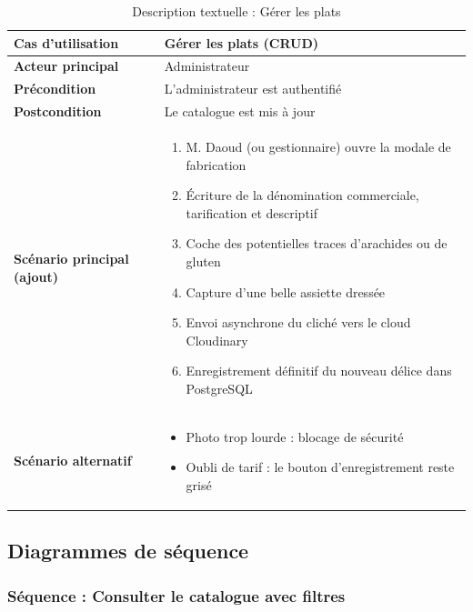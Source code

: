 \begin{table}[H]
    \centering
    \caption{Description textuelle : Gérer les plats}
    \label{tab:desc_gerer_plats}
    \renewcommand{\arraystretch}{1.3}
    \begin{tabular}{|p{4cm}|p{8.5cm}|}
        \hline
        \textbf{Cas d'utilisation} & Gérer les plats (CRUD) \\
        \hline
        \textbf{Acteur principal} & Administrateur \\
        \hline
        \textbf{Précondition} & L'administrateur est authentifié \\
        \hline
        \textbf{Postcondition} & Le catalogue est mis à jour \\
        \hline
        \textbf{Scénario principal (ajout)} &
        \begin{enumerate}
            \item M. Daoud (ou gestionnaire) ouvre la modale de fabrication
            \item Écriture de la dénomination commerciale, tarification et descriptif
            \item Coche des potentielles traces d'arachides ou de gluten
            \item Capture d'une belle assiette dressée
            \item Envoi asynchrone du cliché vers le cloud Cloudinary
            \item Enregistrement définitif du nouveau délice dans PostgreSQL
        \end{enumerate} \\
        \hline
        \textbf{Scénario alternatif} &
        \begin{itemize}
            \item[4a.] Photo trop lourde : blocage de sécurité
            \item[2a.] Oubli de tarif : le bouton d'enregistrement reste grisé
        \end{itemize} \\
        \hline
    \end{tabular}
\end{table}

\subsection{Diagrammes de séquence}

\subsubsection{Séquence : Consulter le catalogue avec filtres}

